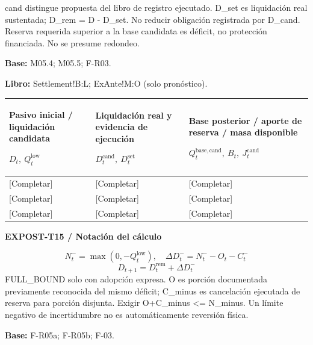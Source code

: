 cand distingue propuesta del libro de registro ejecutado. D\_set es liquidación real sustentada; D\_rem = D - D\_set. No reducir obligación registrada por D\_cand. Reserva requerida superior a la base candidata es déficit, no protección financiada. No se presume redondeo.\par
\textbf{Base:} M05.4; M05.5; F-R03.\par
\textbf{Libro:} Settlement!B:L; ExAnte!M:O (solo pronóstico).\par\endgroup
{\sffamily\fontsize{8.3}{10.3}\selectfont\begin{longtable}{@{}P{54.83mm} P{54.83mm} P{54.83mm}@{}}
\toprule
\textbf{Pasivo inicial / liquidación candidata}\par {\normalfont\fontsize{8.2}{10}\selectfont $D_t,\ Q_t^{\mathrm{low}}$} & \textbf{Liquidación real y evidencia de ejecución}\par {\normalfont\fontsize{8.2}{10}\selectfont $D_t^{\mathrm{cand}},\ D_t^{\mathrm{set}}$} & \textbf{Base posterior / aporte de reserva / masa disponible}\par {\normalfont\fontsize{8.2}{10}\selectfont $Q_t^{\mathrm{base,cand}},\ B_t,\ J_t^{\mathrm{cand}}$}\\\midrule\endhead
\rule{0pt}{8mm}[Completar] & [Completar] & [Completar]\\\hline
\rule{0pt}{8mm}[Completar] & [Completar] & [Completar]\\\hline
\rule{0pt}{8mm}[Completar] & [Completar] & [Completar]\\\hline
\end{longtable}}
\par\begingroup\sffamily\fontsize{8}{10}\selectfont\color{NEBGreen}\setlength{\parskip}{2pt}\setlength{\abovedisplayskip}{4pt}\setlength{\belowdisplayskip}{4pt}\setlength{\abovedisplayshortskip}{2pt}\setlength{\belowdisplayshortskip}{3pt}
\textbf{EXPOST-T15 / Notación del cálculo}\par
{\fontsize{9}{11}\selectfont\[ N_t^-=\max(0,-Q_t^{\mathrm{low}}),\quad \Delta D_t^-=N_t^- -O_t-C_t^- \]}
{\fontsize{9}{11}\selectfont\[ D_{t+1}=D_t^{\mathrm{rem}}+\Delta D_t^- \]}
FULL\_BOUND solo con adopción expresa. O es porción documentada previamente reconocida del mismo déficit; C\_minus es cancelación ejecutada de reserva para porción disjunta. Exigir O+C\_minus <= N\_minus. Un límite negativo de incertidumbre no es automáticamente reversión física.\par
\textbf{Base:} F-R05a; F-R05b; F-03.\par
